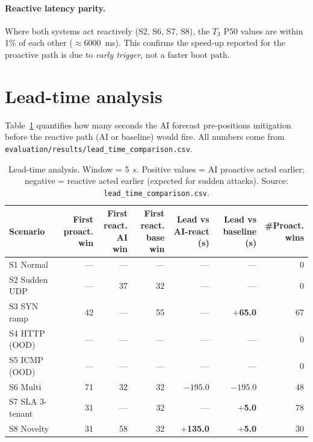 \paragraph{Reactive latency parity.}
Where both systems act reactively (S2, S6, S7, S8), the $T_3$ P50
values are within 1\% of each other ($\approx 6000$~ms). This
confirms the speed-up reported for the proactive path is due to
\emph{early trigger}, not a faster boot path.

\section{Lead-time analysis}
\label{sec:lead-time}

Table~\ref{tab:lead-time} quantifies how many seconds the AI forecast
pre-positions mitigation before the reactive path (AI or baseline) would
fire. All numbers come from
\texttt{evaluation/results/lead\_time\_comparison.csv}.

\begin{table}[H]
\centering
\small
\caption{Lead-time analysis. Window = 5~s. Positive values = AI proactive
acted earlier; negative = reactive acted earlier (expected for sudden attacks).
Source: \texttt{lead\_time\_comparison.csv}.}
\label{tab:lead-time}
\begin{tabular}{@{}lrrrrrr@{}}
\toprule
Scenario & \parbox{1.3cm}{\centering First\\proact.\\win} &
           \parbox{1.3cm}{\centering First\\react.\\AI win} &
           \parbox{1.3cm}{\centering First\\react.\\base win} &
           \parbox{1.6cm}{\centering Lead vs\\AI-react (s)} &
           \parbox{1.6cm}{\centering Lead vs\\baseline (s)} &
           \parbox{1.1cm}{\centering \#Proact.\\wins} \\
\midrule
S1 Normal        & ---& --- & --- & ---       & ---      &  0 \\
S2 Sudden UDP    & ---&  37 &  32 & ---       & ---      &  0 \\
S3 SYN ramp      &  42& --- &  55 & ---       & +\textbf{65.0} & 67 \\
S4 HTTP (OOD)    & ---& --- & --- & ---       & ---      &  0 \\
S5 ICMP (OOD)    & ---& --- & --- & ---       & ---      &  0 \\
S6 Multi         &  71&  32 &  32 & $-195.0$  & $-195.0$ & 48 \\
S7 SLA 3-tenant  &  31& --- &  32 & ---       & +\textbf{5.0}  & 78 \\
S8 Novelty       &  31&  58 &  32 & +\textbf{135.0} & +\textbf{5.0} & 30 \\
\bottomrule
\end{tabular}
\end{table}

